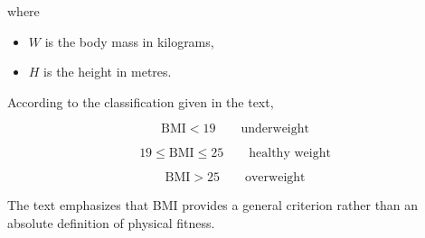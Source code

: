 \documentclass[12pt]{article}
\begin{document}
where

\begin{itemize}
    \item $W$ is the body mass in kilograms,
    \item $H$ is the height in metres.
\end{itemize}

According to the classification given in the text,

\begin{equation*}
\mathrm{BMI}<19
\qquad\text{underweight}
\end{equation*}

\begin{equation*}
19\leq\mathrm{BMI}\leq25
\qquad\text{healthy weight}
\end{equation*}

\begin{equation*}
\mathrm{BMI}>25
\qquad\text{overweight}
\end{equation*}

The text emphasizes that BMI provides a general criterion rather than an absolute definition of physical fitness.
\end{document}
